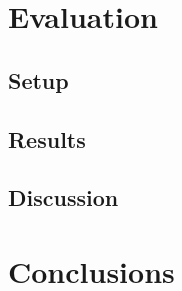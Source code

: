 \documentclass{beamer}
\begin{document}
\section{Evaluation}
\subsection{Setup}
\subsection{Results}
\subsection{Discussion}

\section{Conclusions}








\end{document}

